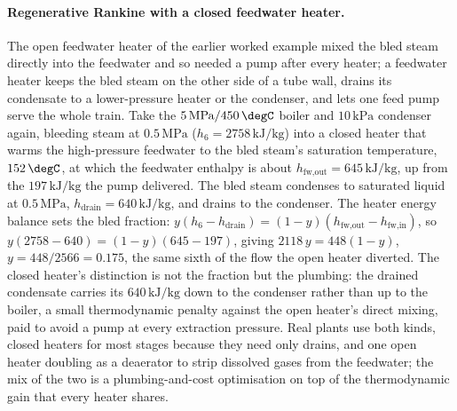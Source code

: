 \paragraph{Regenerative Rankine with a closed feedwater heater.} The open
feedwater heater of the earlier worked example mixed the bled steam directly into
the feedwater and so needed a pump after every heater; a 
feedwater heater keeps the bled steam on the other side of a tube wall, drains
its condensate to a lower-pressure heater or the condenser, and lets one
feed pump serve the whole train. Take the $5\,\text{MPa}/450\,\degC$ boiler and
$10\,\text{kPa}$ condenser again, bleeding steam at $0.5\,\text{MPa}$
($h_6 = 2758\,\text{kJ}/\text{kg}$) into a closed heater that warms the
high-pressure feedwater to the bled steam's saturation temperature,
$152\,\degC$, at which the feedwater enthalpy is about $h_{\text{fw,out}} =
645\,\text{kJ}/\text{kg}$, up from the $197\,\text{kJ}/\text{kg}$ the pump
delivered. The bled steam condenses to saturated liquid at $0.5\,\text{MPa}$,
$h_{\text{drain}} = 640\,\text{kJ}/\text{kg}$, and drains to the condenser. The
heater energy balance sets the bled fraction: $y(h_6 - h_{\text{drain}}) =
(1 - y)(h_{\text{fw,out}} - h_{\text{fw,in}})$, so $y(2758 - 640) =
(1 - y)(645 - 197)$, giving $2118\,y = 448(1 - y)$, $y = 448/2566 = 0.175$,
the same sixth of the flow the open heater diverted. The closed heater's
distinction is not the fraction but the plumbing: the drained condensate carries
its $640\,\text{kJ}/\text{kg}$ down to the condenser rather than up to the boiler,
a small thermodynamic penalty against the open heater's direct mixing, paid to
avoid a pump at every extraction pressure. Real plants use both kinds, closed
heaters for most stages because they need only drains, and one open heater
doubling as a deaerator to strip dissolved gases from the feedwater; the mix of
the two is a plumbing-and-cost optimisation on top of the thermodynamic gain that
every heater shares.

